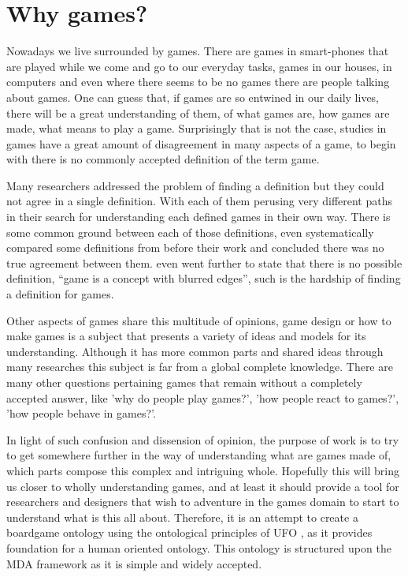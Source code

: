 \section{Why games?}

Nowadays we live surrounded by games. There are games in smart-phones that are played while we come and go to our everyday tasks, games in our houses, in computers and even where there seems to be no games there are people talking about games. One can guess that, if games are so entwined in our daily lives, there will be a great understanding of them, of what games are, how games are made, what means to play a game. Surprisingly that is not the case, studies in games have a great amount of disagreement in many aspects of a game, to begin with there is no commonly accepted definition of the term game. 

Many researchers addressed the problem of finding a definition \citep{jarvinen2009games,salen2004rules,crawford1984art,schell2014art,juul2010game} but they could not agree in a single definition. With each of them perusing very different paths in their search for understanding each defined games in their own way. There is some common ground between each of those definitions, \cite{salen2004rules} even systematically compared some definitions from before their work and concluded there was no true agreement between them. \cite{wittgenstein_philosophical_2009} even went further to state that there is no possible definition, ``game is a concept with blurred edges'', such is the hardship of finding a definition for games.

Other aspects of games share this multitude of opinions, game design or how to make games is a subject that presents a variety of ideas and models for its understanding. Although it has more common parts and shared ideas through many researches this subject is far from a global complete knowledge. There are many other questions pertaining games that remain without a completely accepted answer, like 'why do people play games?', 'how people react to games?', 'how people behave in games?'.

In light of such confusion and dissension of opinion, the purpose of work is to try to get somewhere further in the way of understanding what are games made of, which parts compose this complex and intriguing whole. Hopefully this will bring us closer to wholly understanding games, and at least it should provide a tool for researchers and designers that wish to adventure in the games domain to start to understand what is this all about. Therefore, it is an attempt to create a boardgame ontology using the ontological principles of UFO \citep{guizzardi_ontological_2005}, as it provides foundation for a human oriented ontology. This ontology is structured upon the MDA framework \citep{Hunicke2004} as it is simple and widely accepted. 
